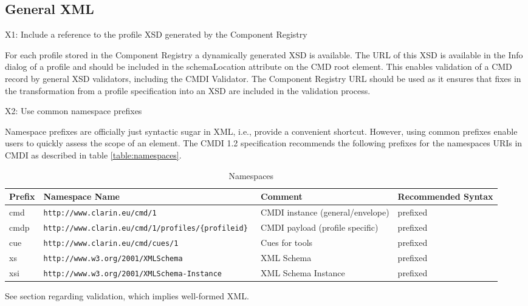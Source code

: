\subsection{General XML}\label{general-xml}

\label{x1}
X1: Include a reference to the profile XSD generated by the Component Registry


For each profile stored in the Component Registry a dynamically generated XSD is available. The URL of this XSD is available in the Info dialog of a profile and should be included in the schemaLocation attribute on the CMD root element. This enables validation of a CMD record by general XSD validators, including the CMDI Validator. The Component Registry URL should be used as it ensures that fixes in the
transformation from a profile specification into an XSD are included in the validation process.

\label{x2}
X2: Use common namespace prefixes

 

Namespace prefixes are officially just syntactic sugar in XML, i.e., provide a convenient shortcut. However, using common prefixes enable users to quickly assess the scope of an element. The CMDI 1.2 specification recommends the following prefixes for the namespaces URIs in CMDI as described in table \vref{table:namespaces}.

\begin{sidewaystable}
\caption{Namespaces}
\label{table:namespaces}
\begin{tabular}{|l|l|l|l|}
    \hline
     \textbf{Prefix} & \textbf{Namespace Name} & \textbf{Comment} & \textbf{Recommended Syntax} \\ \hline
     cmd & \tt{http://www.clarin.eu/cmd/1} & CMDI instance (general/envelope) & prefixed \\ \hline
     cmdp & \tt{http://www.clarin.eu/cmd/1/profiles/\{profileid\}} & CMDI payload (profile specific) & prefixed \\ \hline
     cue & \tt{http://www.clarin.eu/cmd/cues/1} & Cues for tools & prefixed \\ \hline
     xs & \tt{http://www.w3.org/2001/XMLSchema} & XML Schema & prefixed \\ \hline
     xsi & \tt{http://www.w3.org/2001/XMLSchema-Instance} & XML Schema Instance & prefixed \\ \hline
\end{tabular}
\end{sidewaystable}
See section  regarding validation, which implies well-formed XML.

